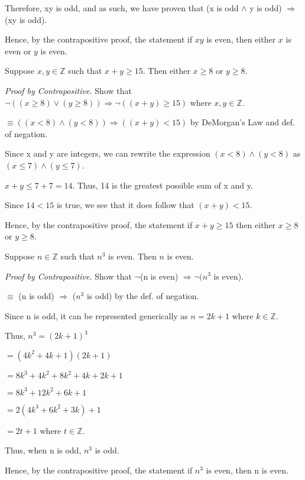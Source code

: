 \documentclass[a4paper,11pt]{article}
\begin{document}
Therefore, xy is odd, and as such, we have proven that (x is odd $\land$ y is odd) $\Rightarrow$ (xy is odd).

\phantom{}

Hence, by the contrapositive proof, the statement if $xy$ is even, then either $x$ is even or $y$ is even.   \fbox \\

\begin{required}
Suppose $x, y \in \mathbb{Z}$ such that $x + y \geq 15$. Then either $x \geq 8$ or $y \geq 8$. 
\end{required}
\emph{Proof by Contrapositive.} Show that $\neg((x \geq 8) \vee (y \geq 8)) \Rightarrow \neg((x+y) \geq 15)$ where $x,y \in \mathbb{Z}$.

$\equiv ((x < 8) \land (y < 8)) \Rightarrow ((x+y) < 15)$ by DeMorgan's Law and def. of negation.

\phantom{}

Since x and y are integers, we can rewrite the expression $(x < 8) \land (y < 8)$ as $(x \leq 7) \land (y \leq 7)$.

$x+y \leq 7+7 = 14$. Thus, 14 is the greatest possible sum of x and y. %

Since $14 < 15$ is true, we see that it does follow that $(x+y) < 15$.

\phantom{}

Hence, by the contrapositive proof, the statement if $x + y \geq 15$ then either $x \geq 8$ or $y \geq 8$.   \fbox \\

\begin{required}
Suppose $n \in \mathbb{Z}$ such that $n^{3}$ is even. Then $n$ is even.
\end{required}
\emph{Proof by Contrapositive.} Show that $\neg$(n is even) $\Rightarrow \neg(n^3$ is even). 

$\equiv$ (n is odd) $\Rightarrow$ ($n^3$ is odd) by the def. of negation.

\phantom{}

Since n is odd, it can be represented generically as $n = 2k+1$ where $k \in \mathbb{Z}$.

Thus, $n^3 = (2k+1)^3$

$ = (4k^2 + 4k + 1)(2k+1) $

$= 8k^3 + 4k^2 + 8k^2 + 4k + 2k + 1$

$= 8k^3 + 12k^2 + 6k + 1$

$= 2(4k^3 + 6k^2 + 3k) + 1$

$= 2t + 1$ where $t \in \mathbb{Z}$.

Thus, when n is odd, $n^3$ is odd.

Hence, by the contrapositive proof, the statement if $n^3$ is even, then n is even.   \fbox \\
\end{document}
